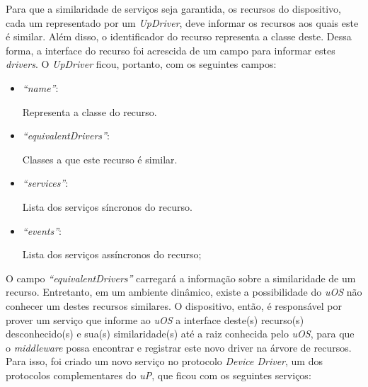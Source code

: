 Para que a similaridade de serviços seja garantida, os recursos do dispositivo, cada um representado por um \emph{UpDriver}, deve informar os recursos aos quais este é similar. Além disso, o identificador do recurso representa a classe deste. Dessa forma, a interface do recurso foi acrescida de um campo para informar estes \emph{drivers}. O \emph{UpDriver} ficou, portanto, com os seguintes campos:

\begin{itemize}
	\item \emph{``name''}:
		
		Representa a classe do recurso.
	\item \emph{``equivalentDrivers''}:
	
		Classes a que este recurso é similar.
	\item \emph{``services''}:

		Lista dos serviços síncronos do recurso.
	\item \emph{``events''}:

		Lista dos serviços assíncronos do recurso;
\end{itemize}

O campo \emph{``equivalentDrivers''} carregará a informação sobre a similaridade de um recurso. Entretanto, em um ambiente dinâmico, existe a possibilidade do \emph{uOS} não conhecer um destes recursos similares. O dispositivo, então, é responsável por prover um serviço que informe ao \emph{uOS} a interface deste(s) recurso(s) desconhecido(s) e sua(s) similaridade(s) até a raiz conhecida pelo \emph{uOS}, para que o \emph{middleware} possa encontrar e registrar este novo driver na árvore de recursos. Para isso, foi criado um novo serviço no protocolo \emph{Device Driver}, um dos protocolos complementares do \emph{uP}, que ficou com os seguintes serviços:

